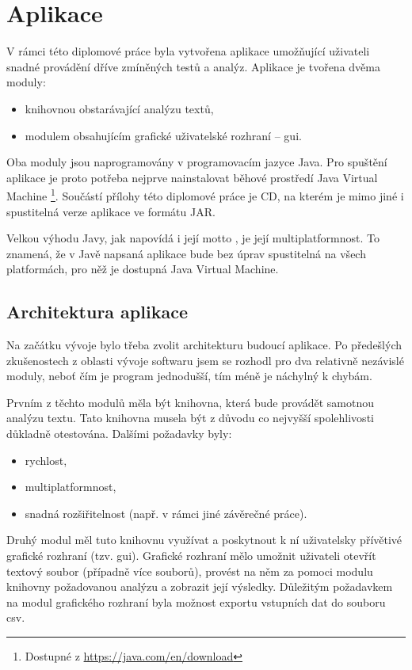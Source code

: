 \documentclass[dp.tex]{subfiles}
\begin{document}
\chapter{Aplikace}

V rámci této diplomové práce byla vytvořena aplikace umožňující uživateli snadné provádění dříve zmíněných testů a analýz. Aplikace je tvořena dvěma moduly:
\begin{itemize}
\item knihovnou obstarávající analýzu textů,
\item modulem obsahujícím grafické uživatelské rozhraní -- \acrshort{gui}.
\end{itemize}

Oba moduly jsou naprogramovány v programovacím jazyce Java. Pro spuštění aplikace je proto potřeba nejprve nainstalovat běhové prostředí Java Virtual Machine \footnote{Dostupné z \url {https://java.com/en/download}}. Součástí přílohy této diplomové práce je CD, na kterém je mimo jiné i spustitelná verze aplikace ve formátu JAR.

Velkou výhodu Javy, jak napovídá i její motto , je její multiplatformnost. To znamená, že v Javě napsaná aplikace bude bez úprav spustitelná na všech platformách, pro něž je dostupná Java Virtual Machine. 

\section{Architektura aplikace}

Na začátku vývoje bylo třeba zvolit architekturu budoucí aplikace. Po předešlých zkušenostech z oblasti vývoje softwaru jsem se rozhodl pro dva relativně nezávislé moduly, neboť čím je program jednodušší, tím méně je náchylný k chybám. 

Prvním z těchto modulů měla být knihovna, která bude provádět samotnou analýzu textu. Tato knihovna musela být z důvodu co nejvyšší spolehlivosti důkladně otestována. Dalšími požadavky byly:
\begin{itemize}
\item rychlost,
\item multiplatformnost,
\item snadná rozšiřitelnost (např. v rámci jiné závěrečné práce).
\end{itemize}

Druhý modul měl tuto knihovnu využívat a poskytnout k ní uživatelsky přívětivé grafické rozhraní (tzv. \acrshort{gui}). Grafické rozhraní mělo umožnit uživateli otevřít textový soubor (případně více souborů), provést na něm za pomoci modulu knihovny požadovanou analýzu a zobrazit její výsledky. Důležitým požadavkem na modul grafického rozhraní byla možnost exportu vstupních dat do souboru \acrshort{csv}. 
\end{document}
